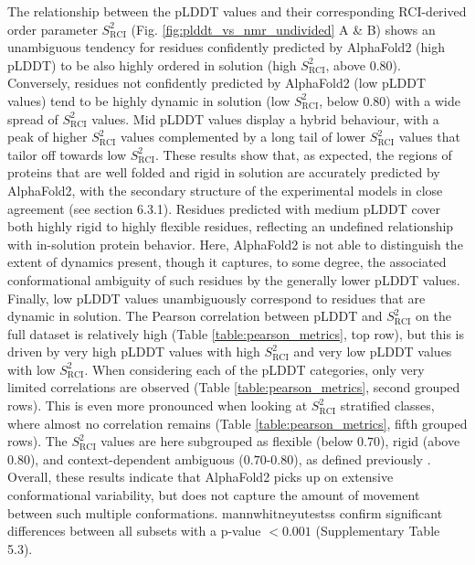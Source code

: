 The relationship between the pLDDT values and their corresponding RCI-derived order parameter $S^{2}_{\text{RCI}}$ (Fig. \ref{fig:plddt_vs_nmr_undivided} A \& B) shows an unambiguous tendency for residues confidently predicted by AlphaFold2 (high pLDDT) to be also highly ordered in solution (high $S^{2}_{\text{RCI}}$, above 0.80). Conversely, residues not confidently predicted by AlphaFold2 (low pLDDT values) tend to be highly dynamic in solution (low $S^{2}_{\text{RCI}}$, below 0.80) with a wide spread of $S^{2}_{\text{RCI}}$ values. Mid pLDDT values display a hybrid behaviour, with a peak of higher $S^{2}_{\text{RCI}}$ values complemented by a long tail of lower $S^{2}_{\text{RCI}}$ values that tailor off towards low $S^{2}_{\text{RCI}}$. These results show that, as expected, the regions of proteins that are well folded and rigid in solution are accurately predicted by AlphaFold2, with the secondary structure of the experimental models in close agreement (see section 6.3.1). Residues predicted with medium pLDDT cover both highly rigid to highly flexible residues, reflecting an undefined relationship with in-solution protein behavior. Here, AlphaFold2 is not able to distinguish the extent of dynamics present, though it captures, to some degree, the associated conformational ambiguity of such residues by the generally lower pLDDT values. Finally, low pLDDT values unambiguously correspond to residues that are dynamic in solution. The Pearson correlation between pLDDT and $S^{2}_{\text{RCI}}$ on the full dataset is relatively high (Table \ref{table:pearson_metrics}, top row), but this is driven by very high pLDDT values with high $S^{2}_{\text{RCI}}$ and very low pLDDT values with low $S^{2}_{\text{RCI}}$. When considering each of the pLDDT categories, only very limited correlations are observed (Table \ref{table:pearson_metrics}, second grouped rows). This is even more pronounced when looking at $S^{2}_{\text{RCI}}$ stratified classes, where almost no correlation remains (Table \ref{table:pearson_metrics}, fifth grouped rows). The \(S^{2}_{\text{RCI}}\) values are here subgrouped as flexible (below $0.70$), rigid (above $0.80$), and context-dependent ambiguous ($0.70$-$0.80$), as defined previously \cite{cilia_dynamine_2014}. Overall, these results indicate that AlphaFold2 picks up on extensive conformational variability, but does not capture the amount of movement between such multiple conformations. \glspl{mannwhitneyutest}s confirm significant differences between all subsets with a p-value \( < 0.001 \) (Supplementary Table 5.3).

